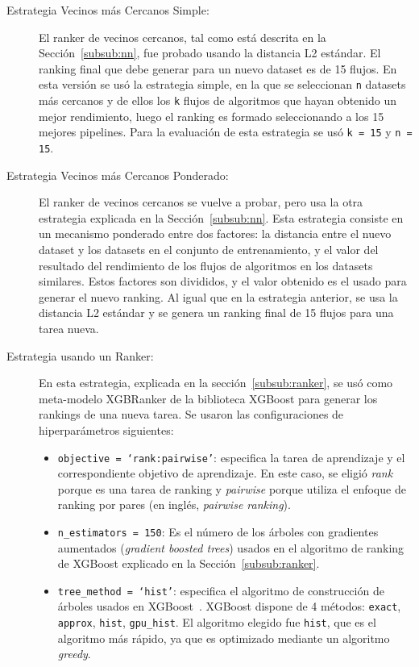 \begin{description}
	\item[Estrategia Vecinos más Cercanos Simple:] El ranker de vecinos cercanos, tal como está descrita en la Sección~\ref{subsub:nn}, fue probado usando la distancia L2 estándar. El ranking final que debe generar para un nuevo dataset es de 15 flujos. En esta versión se usó la estrategia simple, en la que se seleccionan \texttt{n} datasets más cercanos y de ellos los \texttt{k} flujos de algoritmos que hayan obtenido un mejor rendimiento, luego el ranking es formado seleccionando a los 15 mejores pipelines. Para la evaluación de esta estrategia se usó \texttt{k = 15} y \texttt{n = 15}.
	\item[Estrategia Vecinos más Cercanos Ponderado:] El ranker de vecinos cercanos se vuelve a probar, pero usa la otra estrategia explicada en la Sección~\ref{subsub:nn}. Esta estrategia consiste en un mecanismo ponderado entre dos factores: la distancia entre el nuevo dataset y los datasets en el conjunto de entrenamiento, y el valor del resultado del rendimiento de los flujos de algoritmos en los datasets similares. Estos factores son divididos, y el valor obtenido es el usado para generar el nuevo ranking. Al igual que en la estrategia anterior, se usa la distancia L2 estándar y se genera un ranking final de 15 flujos para una tarea nueva.
	\item[Estrategia usando un Ranker:] En esta estrategia, explicada en la sección~\ref{subsub:ranker}, se usó como meta-modelo XGBRanker de la biblioteca XGBoost para generar los rankings de una nueva tarea. Se usaron las configuraciones de hiperparámetros siguientes: 	
	\begin{itemize}
		\item \texttt{objective = `rank:pairwise'}: especifica la tarea de aprendizaje y el correspondiente objetivo de aprendizaje. En este caso, se eligió \textit{rank} porque es una tarea de ranking y \textit{pairwise} porque utiliza el enfoque de ranking por pares (en inglés, \textit{pairwise ranking}).
		\item \texttt{n\_estimators = 150}: Es el número de los árboles con gradientes aumentados (\textit{gradient boosted trees}) usados en el algoritmo de ranking de XGBoost explicado en la Sección~\ref{subsub:ranker}.
		\item \texttt{tree\_method = `hist'}: especifica el algoritmo de construcción de árboles usados en XGBoost~\cite{xgboost}. XGBoost dispone de 4 métodos: \texttt{exact}, \texttt{approx}, \texttt{hist}, \texttt{gpu\_hist}. El algoritmo elegido fue \texttt{hist}, que es el algoritmo más rápido, ya que es optimizado mediante un algoritmo \textit{greedy}.

\end{itemize}
\end{description}
